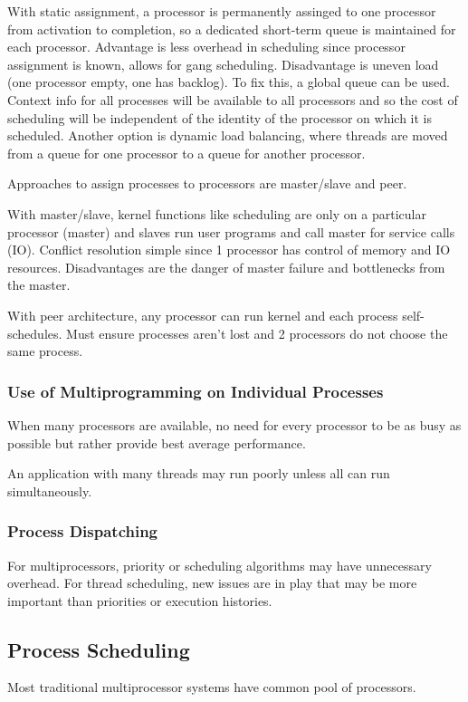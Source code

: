 \documentclass[11pt]{article}
\begin{document}
With static assignment, a processor is permanently assinged to one processor from
activation to completion, so a dedicated short-term queue is maintained for each
processor.
Advantage is less overhead in scheduling since processor assignment is known,
allows for gang scheduling.
Disadvantage is uneven load (one processor empty, one has backlog). To fix this,
a global queue can be used.
Context info for all processes will be available to all processors and so the
cost of scheduling will be independent of the identity of the processor on which
it is scheduled.
Another option is dynamic load balancing, where threads are moved from a queue
for one processor to a queue for another processor.

Approaches to assign processes to processors are master/slave and peer.

With master/slave, kernel functions like scheduling are only on a particular
processor (master) and slaves run user programs and call master for service
calls (IO).
Conflict resolution simple since 1 processor has control of memory and IO resources.
Disadvantages are the danger of master failure and bottlenecks from the master.

With peer architecture, any processor can run kernel and each process self-schedules.
Must ensure processes aren't lost and 2 processors do not choose the same process.
\subsubsection{Use of Multiprogramming on Individual Processes}
\label{sec:orged3542c}
When many processors are available, no need for every processor to be as busy as
possible but rather provide best average performance.

An application with many threads may run poorly unless all can run simultaneously.
\subsubsection{Process Dispatching}
\label{sec:org375f03f}
For multiprocessors, priority or scheduling algorithms may have unnecessary overhead.
For thread scheduling, new issues are in play that may be more important than
priorities or execution histories.
\subsection{Process Scheduling}
\label{sec:org97283b9}
Most traditional multiprocessor systems have common pool of processors.
\end{document}
